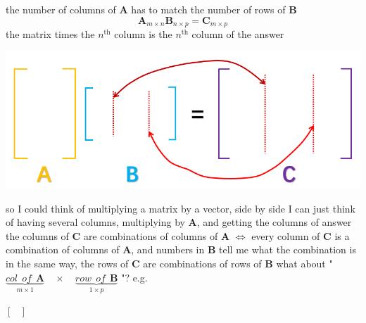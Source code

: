 \documentclass[12pt, a4paper]{article}
\begin{document}
\vspace{14pt}
\newline
{\textcolor{anhao-scarlet}{the number of columns of ${\mathbf{A}}$ has to match the number of rows of ${\mathbf{B}}$}
\begin{displaymath}
	{\mathbf{A}}_{m \times n}{\mathbf{B}}_{n \times p} = {\mathbf{C}}_{m \times p}
\end{displaymath}
\vspace{14pt}
the matrix times the $n^{\text{th}}$ column is the $n^{\text{th}}$ column of the answer
\begin{center}
	\includegraphics[scale=0.5]{figures/S3-1.png}
\end{center}
so I could think of multiplying a matrix by a vector, side by side
\newline
I can just think of having several columns, multiplying by ${\mathbf{A}}$, and getting the columns of answer
\vspace{14pt}
\newline
{\textcolor{anhao-purple}{the columns of ${\mathbf{C}}$ are combinations of columns of ${\mathbf{A}}$}}
\newline
$\Longleftrightarrow$ every column of ${\mathbf{C}}$ is a combination of columns of ${\mathbf{A}}$, and numbers in ${\mathbf{B}}$ tell me what the combination is
\newline
in the same way, {\textcolor{anhao-purple}{the rows of ${\mathbf{C}}$ are combinations of rows of ${\mathbf{B}}$}}
\vspace{14pt}
\newline
what about " 
\begin{math}
	\underbrace{col \ \ of \ \ {\mathbf{A}}}_{m \times 1}
	\quad \times \quad
	\underbrace{row \ \ of \ \ {\mathbf{B}}}_{1 \times p}
\end{math}
 "?
\newline
e.g.
\par 
\begin{math}
	\begin{bmatrix}

\end{bmatrix}
\end{math}}
\end{document}

